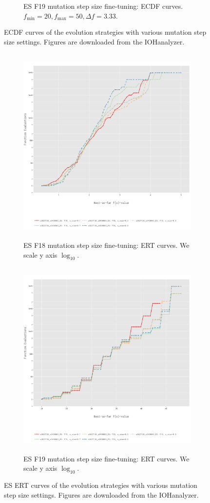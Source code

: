 \documentclass{article}
\begin{document}
\begin{figure}[!ht]
\begin{subfigure}[h]{0.95\linewidth}
        \caption{ES F19 mutation step size fine-tuning: ECDF curves. $f_{\min} = 20, f_{\max} = 50, \Delta f = 3.33$.}
    \end{subfigure}
    \caption{ECDF curves of the evolution strategies with various mutation step size settings. Figures are downloaded from the IOHanalyzer.}
    \label{fig:experi-es-ssize-ecdf}
\end{figure}

\begin{figure}[!ht]
    \centering
    \begin{subfigure}[h]{0.95\linewidth}
        \includegraphics[width=\linewidth, height=10cm]{es/f18/ERT18ss.png}
        \caption{ES F18 mutation step size fine-tuning: ERT curves. We scale y axis $\log_{10}$.}
    \end{subfigure}
    \hfill
    \begin{subfigure}[h]{0.95\linewidth}
        \includegraphics[width=\linewidth, height=10cm]{es/f19/ERT19ss.png}
        \caption{ES F19 mutation step size fine-tuning: ERT curves. We scale y axis $\log_{10}$.}
    \end{subfigure}
    \caption{ES ERT curves of the evolution strategies with various mutation step size settings. Figures are downloaded from the IOHanalyzer.}
    \label{fig:experi-es-ssize-ert}
\end{figure}
\end{document}

